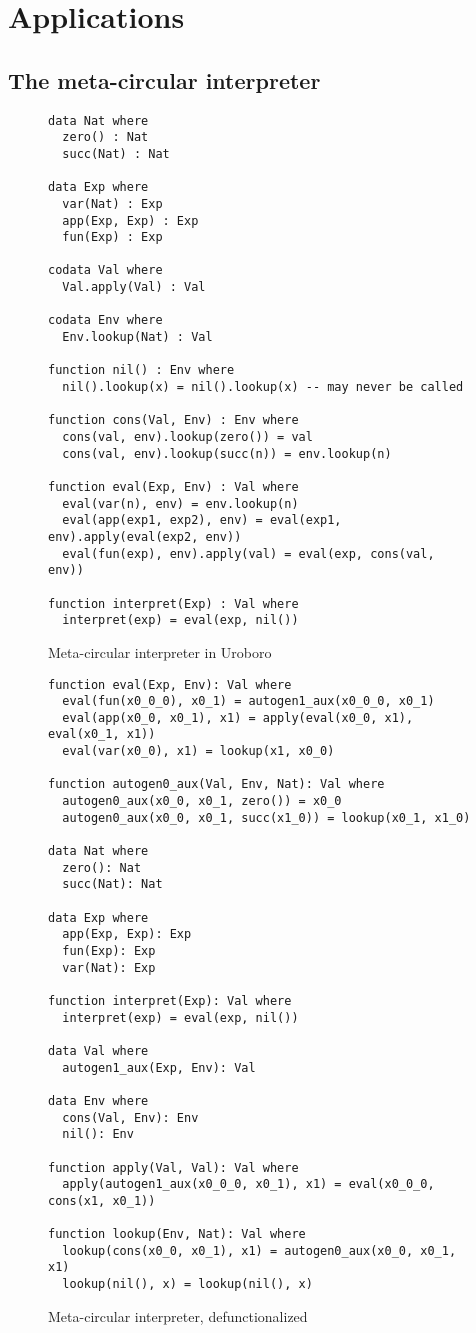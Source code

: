 \section{Applications}
\label{sec:appl}

\subsection{The meta-circular interpreter}
\label{ssec:mci}

\begin{figure}
\begin{lstlisting}
data Nat where
  zero() : Nat
  succ(Nat) : Nat

data Exp where
  var(Nat) : Exp
  app(Exp, Exp) : Exp
  fun(Exp) : Exp

codata Val where
  Val.apply(Val) : Val

codata Env where
  Env.lookup(Nat) : Val

function nil() : Env where
  nil().lookup(x) = nil().lookup(x) -- may never be called

function cons(Val, Env) : Env where
  cons(val, env).lookup(zero()) = val
  cons(val, env).lookup(succ(n)) = env.lookup(n)

function eval(Exp, Env) : Val where
  eval(var(n), env) = env.lookup(n)
  eval(app(exp1, exp2), env) = eval(exp1, env).apply(eval(exp2, env))
  eval(fun(exp), env).apply(val) = eval(exp, cons(val, env))

function interpret(Exp) : Val where
  interpret(exp) = eval(exp, nil())
\end{lstlisting}
\caption{Meta-circular interpreter in Uroboro}
\label{fig:mci}
\end{figure}

\begin{figure}

\begin{lstlisting}
function eval(Exp, Env): Val where
  eval(fun(x0_0_0), x0_1) = autogen1_aux(x0_0_0, x0_1)
  eval(app(x0_0, x0_1), x1) = apply(eval(x0_0, x1), eval(x0_1, x1))
  eval(var(x0_0), x1) = lookup(x1, x0_0)

function autogen0_aux(Val, Env, Nat): Val where
  autogen0_aux(x0_0, x0_1, zero()) = x0_0
  autogen0_aux(x0_0, x0_1, succ(x1_0)) = lookup(x0_1, x1_0)

data Nat where
  zero(): Nat
  succ(Nat): Nat

data Exp where
  app(Exp, Exp): Exp
  fun(Exp): Exp
  var(Nat): Exp

function interpret(Exp): Val where
  interpret(exp) = eval(exp, nil())

data Val where
  autogen1_aux(Exp, Env): Val

data Env where
  cons(Val, Env): Env
  nil(): Env

function apply(Val, Val): Val where
  apply(autogen1_aux(x0_0_0, x0_1), x1) = eval(x0_0_0, cons(x1, x0_1))

function lookup(Env, Nat): Val where
  lookup(cons(x0_0, x0_1), x1) = autogen0_aux(x0_0, x0_1, x1)
  lookup(nil(), x) = lookup(nil(), x)
\end{lstlisting}
\caption{Meta-circular interpreter, defunctionalized}
\label{fig:mcidefunced}
\end{figure}

